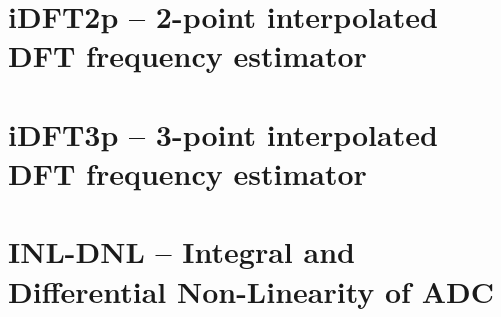 \documentclass[12pt,a4paper,oneside]{report} %
\begin{document}
\section*{\examplesection} %

\resumecontents[maintoc]

\chapter{iDFT2p -- 2-point interpolated DFT frequency estimator} %
\stopcontents[maintoc]
\section*{\infosection} %

\section*{\examplesection} %

\resumecontents[maintoc]

\chapter{iDFT3p -- 3-point interpolated DFT frequency estimator} %
\stopcontents[maintoc]
\section*{\infosection} %

\section*{\examplesection} %

\resumecontents[maintoc]

\chapter{INL-DNL -- Integral and Differential Non-Linearity of ADC} %
\stopcontents[maintoc]
\end{document}
